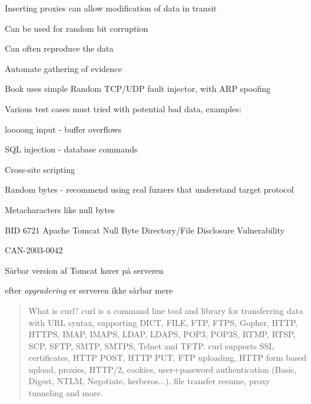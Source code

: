 \documentclass[Screen16to9,17pt]{foils}
\begin{document}
\begin{list1}
\item Inserting proxies can allow modification of data in transit
\item Can be used for random bit corruption
\item Can often reproduce the data
\item Automate gathering of evidence
\item Book uses simple Random TCP/UDP fault injector, with ARP spoofing
\item Various test cases must tried with potential bad data, examples:
\begin{list2}
\item loooong input - buffer overflows
\item SQL injection - database commands
\item Cross-site scripting
\item Random bytes - recommend using real fuzzers that understand target protocol
\item Metacharacters like null bytes
\end{list2}
\end{list1}




\begin{list1}
\item BID 6721 Apache Tomcat Null Byte Directory/File Disclosure Vulnerability
\item {}
\item CAN-2003-0042
\end{list1}




\centerline{Sårbar version af Tomcat kører på serveren}



\centerline{efter \emph{opgradering} er serveren ikke sårbar mere}




\begin{quote}
	What is curl?
curl is a command line tool and library for transferring data with URL syntax, supporting DICT, FILE, FTP, FTPS, Gopher, HTTP, HTTPS, IMAP, IMAPS, LDAP, LDAPS, POP3, POP3S, RTMP, RTSP, SCP, SFTP, SMTP, SMTPS, Telnet and TFTP. curl supports SSL certificates, HTTP POST, HTTP PUT, FTP uploading, HTTP form based upload, proxies, HTTP/2, cookies, user+password authentication (Basic, Digest, NTLM, Negotiate, kerberos...), file transfer resume, proxy tunneling and more.
\end{quote}
\end{document}
